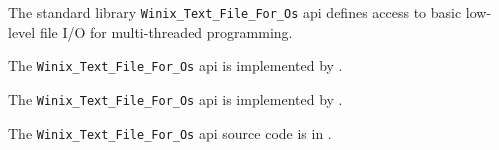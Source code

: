 
The standard library {\tt Winix\_Text\_File\_For\_Os} api defines access to basic low-level 
file I/O for multi-threaded programming.

The {\tt Winix\_Text\_File\_For\_Os} api is implemented by .

The {\tt Winix\_Text\_File\_For\_Os} api is implemented by .

The {\tt Winix\_Text\_File\_For\_Os} api source code is in .
